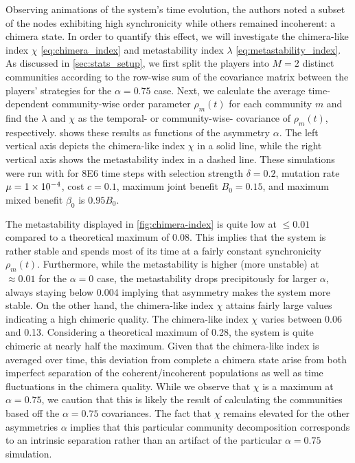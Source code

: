 \documentclass[pdflatex,lineno,referee,sn-mathphys-ay]{sn-jnl}
\begin{document}
Observing animations of the system's time evolution,
the authors noted a subset of the nodes exhibiting high synchronicity
while others remained incoherent: a chimera state.
In order to quantify this effect, we will investigate
the chimera-like index $\chi$ \cref{eq:chimera_index}
and metastability index $\lambda$ \cref{eq:metastability_index}.
As discussed in \cref{sec:stats_setup},
we first split the players into $M=2$ distinct communities
according to the row-wise sum of the covariance matrix
between the players' strategies for the $\alpha = \num{0.75}$ case.
Next, we calculate the average time-dependent community-wise
order parameter $\rho_m(t)$
for each community $m$ and find the $\lambda$ and $\chi$
as the temporal- or community-wise- covariance of
$\rho_m(t)$, respectively.
 shows these results
as functions of the asymmetry $\alpha$.
The left vertical axis depicts the chimera-like index $\chi$
in a solid line,
while the right vertical axis shows the metastability index
in a dashed line.
These simulations were run with
for \num{8E6} time steps with
selection strength $\delta = 0.2$,
mutation rate $\mu=\num{1E-4}$,
cost $c = \num{0.1}$,
maximum joint benefit $B_0 = 0.15$,
and maximum mixed benefit $\beta_0$ is $\num{0.95} B_0$.

The metastability displayed in \cref{fig:chimera-index}
is quite low at $\le \num{0.01}$ compared
to a theoretical maximum of \num{0.08}.
This implies that the system is rather stable
and spends most of its time at a fairly constant
synchronicity $\rho_m(t)$.
Furthermore, while the metastability is higher (more unstable)
at $\approx \num{0.01}$ for the $\alpha = 0$ case,
the metastability drops precipitously for larger $\alpha$,
always staying below \num{0.004} implying that
asymmetry makes the system more stable.
On the other hand, the chimera-like index $\chi$
attains fairly large values indicating a high chimeric quality.
The chimera-like index $\chi$ varies between \num{0.06} and \num{0.13}.
Considering a theoretical maximum of \num{0.28},
the system is quite chimeric at nearly half the maximum.
Given that the chimera-like index is averaged over time,
this deviation from complete a chimera state
arise from both imperfect separation of the coherent/incoherent populations
as well as time fluctuations in the chimera quality.
While we observe that $\chi$ is a maximum at $\alpha = \num{0.75}$,
we caution that this is likely the result of calculating the communities
based off the $\alpha = \num{0.75}$ covariances.
The fact that $\chi$ remains elevated for the other asymmetries $\alpha$
implies that this particular community decomposition
corresponds to an intrinsic separation rather than an artifact
of the particular $\alpha = \num{0.75}$ simulation.
\end{document}
